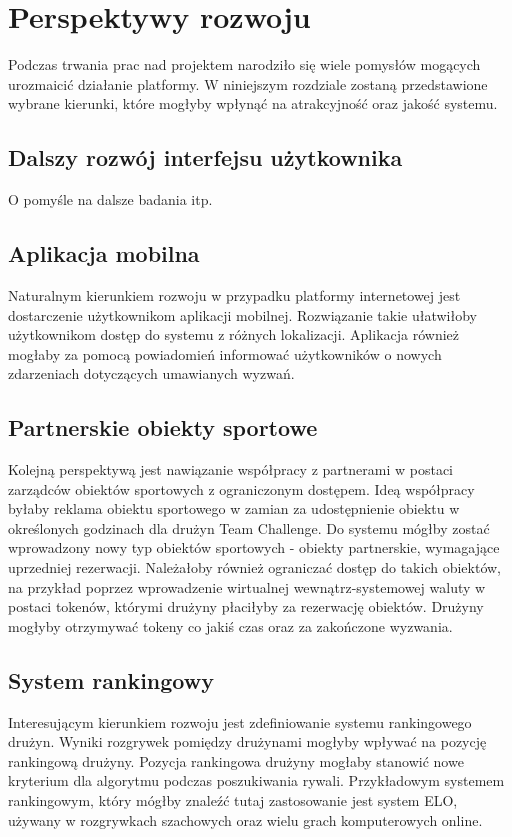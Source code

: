 \chapter{Perspektywy rozwoju}

Podczas trwania prac nad projektem narodziło się wiele pomysłów mogących urozmaicić działanie platformy. W niniejszym rozdziale zostaną przedstawione wybrane kierunki, które mogłyby wpłynąć na atrakcyjność oraz jakość systemu.

\section{Dalszy rozwój interfejsu użytkownika}

O pomyśle na dalsze badania itp.

\section{Aplikacja mobilna}

Naturalnym kierunkiem rozwoju w przypadku platformy internetowej jest dostarczenie użytkownikom aplikacji mobilnej. Rozwiązanie takie ułatwiłoby użytkownikom dostęp do systemu z różnych lokalizacji. Aplikacja również mogłaby za pomocą powiadomień informować użytkowników o nowych zdarzeniach dotyczących umawianych wyzwań.

\section{Partnerskie obiekty sportowe}

Kolejną perspektywą jest nawiązanie współpracy z partnerami w postaci zarządców obiektów sportowych z ograniczonym dostępem. Ideą współpracy byłaby reklama obiektu sportowego w zamian za udostępnienie obiektu w określonych godzinach dla drużyn Team Challenge. Do systemu mógłby zostać wprowadzony nowy typ obiektów sportowych - obiekty partnerskie, wymagające uprzedniej rezerwacji. Należałoby również ograniczać dostęp do takich obiektów, na przykład poprzez wprowadzenie wirtualnej wewnątrz-systemowej waluty w postaci tokenów, którymi drużyny płaciłyby za rezerwację obiektów. Drużyny mogłyby otrzymywać tokeny co jakiś czas oraz za zakończone wyzwania.

\section{System rankingowy}

Interesującym kierunkiem rozwoju jest zdefiniowanie systemu rankingowego drużyn. Wyniki rozgrywek pomiędzy drużynami mogłyby wpływać na pozycję rankingową drużyny. Pozycja rankingowa drużyny mogłaby stanowić nowe kryterium dla algorytmu podczas poszukiwania rywali. Przykładowym systemem rankingowym, który mógłby znaleźć tutaj zastosowanie jest system ELO, używany w rozgrywkach szachowych oraz wielu grach komputerowych online.

\begin{comment}

proponowanei spotkan przez zawodnikow
propozycje pobliskich obiektow przy negocjacjach miejsca
system notyfikacji

\end{comment}